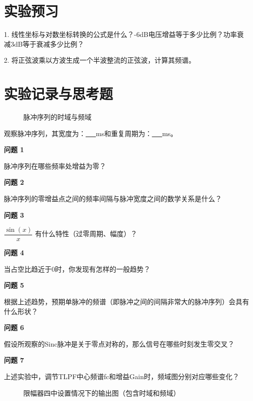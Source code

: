 \documentclass{sasreport}
\begin{document}
\maketitle

\section{实验预习}
1. 线性坐标与对数坐标转换的公式是什么？-6dB电压增益等于多少比例？功率衰减3dB等于衰减多少比例？

2. 将正弦波乘以方波生成一个半波整流的正弦波，计算其频谱。

\section{实验记录与思考题}
\begin{figure}[H]
    \caption{脉冲序列的时域与频域}
    \centering

\end{figure}

观察脉冲序列，其宽度为：\underline{\ \ \ }ms和重复周期为：\underline{\ \ \ }ms。

\textbf{问题 1}

脉冲序列在哪些频率处增益为零？

\textbf{问题 2}

脉冲序列的零增益点之间的频率间隔与脉冲宽度之间的数学关系是什么？

\textbf{问题 3}

$\dfrac{\sin(x)}{x}$ 有什么特性（过零周期、幅度）？

\textbf{问题 4}

当占空比趋近于0时，你发现有怎样的一般趋势？

\textbf{问题 5}

根据上述趋势，预期单脉冲的频谱（即脉冲之间的间隔非常大的脉冲序列）会具有什么形状？

\textbf{问题 6}

假设所观察的Sinc脉冲是关于零点对称的，那么信号在哪些时刻发生零交叉？

\textbf{问题 7}

上述实验中，调节TLPF中心频谱fc和增益Gain时，频域图分别对应哪些变化？

\begin{figure}[H]
    \caption{限幅器四中设置情况下的输出图（包含时域和频域）}
    \centering

\end{figure}
\end{document}
